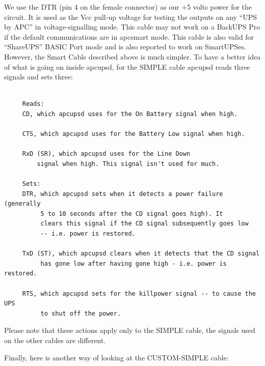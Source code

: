 We use the DTR (pin 4 on the female connector) as our +5 volts power for the
circuit. It is used as the Vcc pull-up voltage for testing the outputs on any
``UPS by APC'' in voltage-signalling mode.  This cable may not work on a
BackUPS Pro if the default communications are in apcsmart mode. This cable is
also valid for ``ShareUPS'' BASIC Port mode and is also reported to work on
SmartUPSes. However, the Smart Cable described above is much simpler. To have
a better idea of what is going on inside apcupsd, for the SIMPLE cable apcupsd
reads three signals and sets three: 

\footnotesize
\begin{verbatim}
     
     Reads:
     CD, which apcupsd uses for the On Battery signal when high.
     
     CTS, which apcupsd uses for the Battery Low signal when high.
     
     RxD (SR), which apcupsd uses for the Line Down
         signal when high. This signal isn't used for much.
     
     Sets:
     DTR, which apcupsd sets when it detects a power failure (generally
          5 to 10 seconds after the CD signal goes high). It
          clears this signal if the CD signal subsequently goes low
          -- i.e. power is restored.
     
     TxD (ST), which apcupsd clears when it detects that the CD signal
          has gone low after having gone high - i.e. power is restored.
     
     RTS, which apcupsd sets for the killpower signal -- to cause the UPS
          to shut off the power.
\end{verbatim}
\normalsize

Please note that these actions apply only to the SIMPLE cable, the signals
used on the other cables are different.  

Finally, here is another way of looking at the CUSTOM-SIMPLE cable: 


